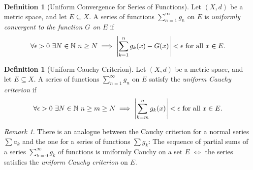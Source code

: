 \documentclass[12pt, lettersize]{book}
\theoremstyle{plain}
\theoremstyle{definition}
\newtheorem{dfn}[thm]{Definition}
\theoremstyle{remark}
\newtheorem*{rem}{Remark}
\newcommand{\N}{\mathbb{N}}
\begin{document}
			\begin{dfn}[Uniform Convergence for Series of Functions]
			Let $(X,d)$ be a metric space, and let $E\subseteq X$. A series of functions $\sum_{n=1}^{\infty}g_n$ on $E$ is \emph{uniformly convergent to the function $G$ on $E$} if 
			\begin{displaymath}
				\forall\epsilon>0\ \exists N\in\N\ n\geq N\implies\abs{\sum_{k=1}^{n}g_k(x)-G(x)}<\epsilon\text{ for all $x\in E$.}
			\end{displaymath}
			\end{dfn}
			
			\begin{dfn}[Uniform Cauchy Criterion]
			Let $(X,d)$ be a metric space, and let $E\subseteq X$. A series of functions $\sum_{n=1}^{\infty}g_n$ on $E$ satisfy the \emph{uniform Cauchy criterion} if
			\begin{displaymath}
				\forall\epsilon>0\ \exists N\in\N\ n\geq m\geq N\implies \abs{\sum_{k=m}^{n}g_k(x)}<\epsilon\text{ for all $x\in E$.}
			\end{displaymath} 
			\end{dfn}
			\begin{rem}
				There is an analogue between the Cauchy criterion for a normal series $\sum a_k$ and the one for a series of functions $\sum g_k$: The sequence of partial sums of a series $\sum_{k=0}^{\infty}g_k$ of functions is uniformly Cauchy on a set $E$ $\iff$ the series satisfies the \emph{uniform Cauchy criterion} on $E$.
			\end{rem}
			
\end{document}
